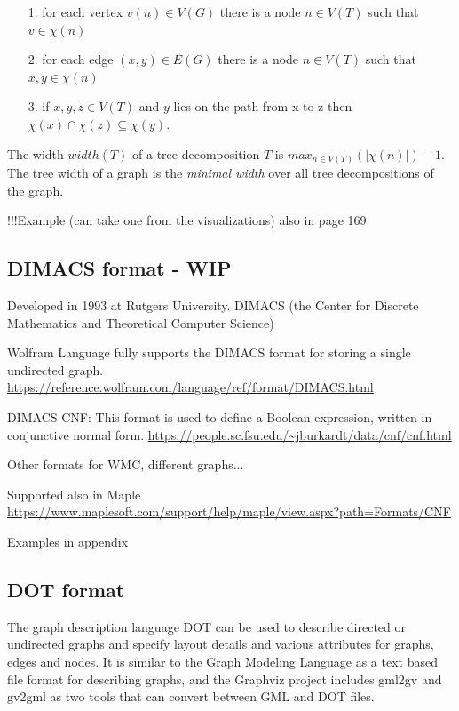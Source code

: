 \documentclass[a4paper, 12pt, bibliography=totoc]{scrartcl}
\begin{document}
\begin{itemize}
	\item[1.] for each vertex $v(n) \in V(G)$ there is a node $n \in V(T)$ such that $v \in \chi(n)$
	\item[2.] for each edge $(x,y) \in E(G)$ there is a node $n\in V(T)$ such that $x,y \in\chi(n)$
	\item[3.] if $x,y,z \in V(T)$ and $y$ lies on the path from x to z then $\chi(x) \cap \chi(z) \subseteq \chi(y)$.
\end{itemize}
The width $width(T)$ of a tree decomposition $T$ is $max_{n\in V(T)}(|\chi(n)|)-1$.
The tree width of a graph is the \textit{minimal width} over all tree decompositions of the graph.


!!!Example (can take one from the visualizations) also in \cite{pcgp2019} page 169

\cite{ARNBORG1991308}

\cite{MSOQueriesGuillaume}

\subsection{DIMACS format - WIP}
Developed in 1993 at Rutgers University.
DIMACS (the Center for Discrete Mathematics and Theoretical Computer Science)

Wolfram Language fully supports the DIMACS format for storing a single undirected graph.
\url{https://reference.wolfram.com/language/ref/format/DIMACS.html}

DIMACS CNF: This format is used to define a Boolean expression, written in conjunctive normal form.
\url{https://people.sc.fsu.edu/~jburkardt/data/cnf/cnf.html}

Other formats for WMC, different graphs...

Supported also in Maple \url{https://www.maplesoft.com/support/help/maple/view.aspx?path=Formats/CNF}

Examples in appendix

\subsection{DOT format}
The graph description language DOT can be used to describe directed or undirected graphs and specify layout details and various attributes for graphs, edges and nodes. It is similar to the Graph Modeling Language as a text based file format for describing graphs, and the Graphviz project includes gml2gv and gv2gml as two tools that can convert between GML and DOT files.
\end{document}

